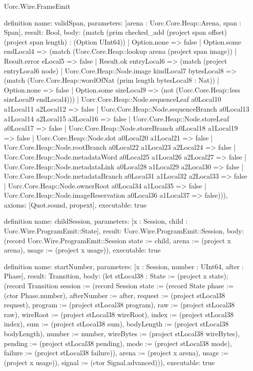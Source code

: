 \begin{lexlean}{Uorc.Wire.FrameEmit}
\begin{semanticmodule}
definition{
  name: validSpan,
  parameters: [arena : Uorc.Core.Heap::Arena, span : Span],
  result: Bool,
  body: (match (prim checked_add (project span offset) (project span length) : (Option UInt64))
    | Option.none => false
    | Option.some endLocal4 => (match (Uorc.Core.Heap::lookup arena (project span image))
      | Result.error eLocal5 => false
      | Result.ok entryLocal6 => (match (project entryLocal6 node)
        | Uorc.Core.Heap::Node.image kindLocal7 bytesLocal8 => (match (Uorc.Core.Heap::wordOfNat (prim length bytesLocal8 : Nat))
          | Option.none => false
          | Option.some sizeLocal9 => (not (Uorc.Core.Heap::less sizeLocal9 endLocal4)))
        | Uorc.Core.Heap::Node.sequenceLeaf a0Local10 a1Local11 a2Local12 => false
        | Uorc.Core.Heap::Node.sequenceBranch a0Local13 a1Local14 a2Local15 a3Local16 => false
        | Uorc.Core.Heap::Node.storeLeaf a0Local17 => false
        | Uorc.Core.Heap::Node.storeBranch a0Local18 a1Local19 => false
        | Uorc.Core.Heap::Node.slot a0Local20 a1Local21 => false
        | Uorc.Core.Heap::Node.rootBranch a0Local22 a1Local23 a2Local24 => false
        | Uorc.Core.Heap::Node.metadataWord a0Local25 a1Local26 a2Local27 => false
        | Uorc.Core.Heap::Node.metadataLink a0Local28 a1Local29 a2Local30 => false
        | Uorc.Core.Heap::Node.metadataBranch a0Local31 a1Local32 a2Local33 => false
        | Uorc.Core.Heap::Node.ownerRoot a0Local34 a1Local35 => false
        | Uorc.Core.Heap::Node.imageReservation a0Local36 a1Local37 => false))),
  axioms: [Quot.sound, propext],
  executable: true
}

definition{
  name: childSession,
  parameters: [x : Session, child : Uorc.Wire.ProgramEmit::State],
  result: Uorc.Wire.ProgramEmit::Session,
  body: (record Uorc.Wire.ProgramEmit::Session {state := child, arena := (project x arena), usage := (project x usage)}),
  executable: true
}

definition{
  name: startNumber,
  parameters: [x : Session, number : UInt64, after : Phase],
  result: Transition,
  body: (let stLocal38 : State := (project x state); (record Transition {session := (record Session {state := (record State {phase := (ctor Phase.number), afterNumber := after, request := (project stLocal38 request), program := (project stLocal38 program), raw := (project stLocal38 raw), wireRoot := (project stLocal38 wireRoot), index := (project stLocal38 index), sum := (project stLocal38 sum), bodyLength := (project stLocal38 bodyLength), number := number, wireBytes := (project stLocal38 wireBytes), pending := (project stLocal38 pending), mode := (project stLocal38 mode), failure := (project stLocal38 failure)}), arena := (project x arena), usage := (project x usage)}), signal := (ctor Signal.advanced)})),
  executable: true
}


\end{semanticmodule}
\end{lexlean}
